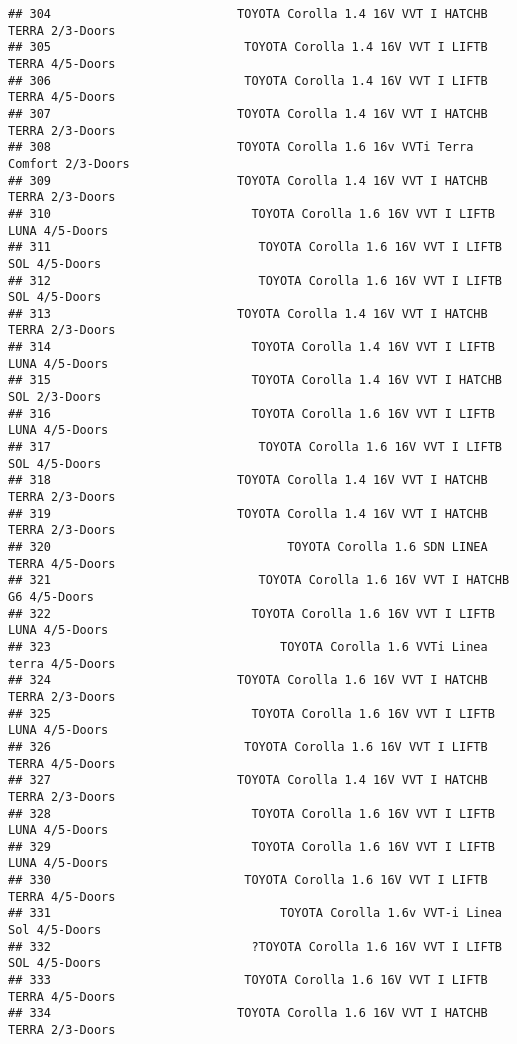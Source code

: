 \documentclass[]{article}
\begin{document}
\begin{verbatim}
## 304                          TOYOTA Corolla 1.4 16V VVT I HATCHB TERRA 2/3-Doors
## 305                           TOYOTA Corolla 1.4 16V VVT I LIFTB TERRA 4/5-Doors
## 306                           TOYOTA Corolla 1.4 16V VVT I LIFTB TERRA 4/5-Doors
## 307                          TOYOTA Corolla 1.4 16V VVT I HATCHB TERRA 2/3-Doors
## 308                          TOYOTA Corolla 1.6 16v VVTi Terra Comfort 2/3-Doors
## 309                          TOYOTA Corolla 1.4 16V VVT I HATCHB TERRA 2/3-Doors
## 310                            TOYOTA Corolla 1.6 16V VVT I LIFTB LUNA 4/5-Doors
## 311                             TOYOTA Corolla 1.6 16V VVT I LIFTB SOL 4/5-Doors
## 312                             TOYOTA Corolla 1.6 16V VVT I LIFTB SOL 4/5-Doors
## 313                          TOYOTA Corolla 1.4 16V VVT I HATCHB TERRA 2/3-Doors
## 314                            TOYOTA Corolla 1.4 16V VVT I LIFTB LUNA 4/5-Doors
## 315                            TOYOTA Corolla 1.4 16V VVT I HATCHB SOL 2/3-Doors
## 316                            TOYOTA Corolla 1.6 16V VVT I LIFTB LUNA 4/5-Doors
## 317                             TOYOTA Corolla 1.6 16V VVT I LIFTB SOL 4/5-Doors
## 318                          TOYOTA Corolla 1.4 16V VVT I HATCHB TERRA 2/3-Doors
## 319                          TOYOTA Corolla 1.4 16V VVT I HATCHB TERRA 2/3-Doors
## 320                                 TOYOTA Corolla 1.6 SDN LINEA TERRA 4/5-Doors
## 321                             TOYOTA Corolla 1.6 16V VVT I HATCHB G6 4/5-Doors
## 322                            TOYOTA Corolla 1.6 16V VVT I LIFTB LUNA 4/5-Doors
## 323                                TOYOTA Corolla 1.6 VVTi Linea terra 4/5-Doors
## 324                          TOYOTA Corolla 1.6 16V VVT I HATCHB TERRA 2/3-Doors
## 325                            TOYOTA Corolla 1.6 16V VVT I LIFTB LUNA 4/5-Doors
## 326                           TOYOTA Corolla 1.6 16V VVT I LIFTB TERRA 4/5-Doors
## 327                          TOYOTA Corolla 1.4 16V VVT I HATCHB TERRA 2/3-Doors
## 328                            TOYOTA Corolla 1.6 16V VVT I LIFTB LUNA 4/5-Doors
## 329                            TOYOTA Corolla 1.6 16V VVT I LIFTB LUNA 4/5-Doors
## 330                           TOYOTA Corolla 1.6 16V VVT I LIFTB TERRA 4/5-Doors
## 331                                TOYOTA Corolla 1.6v VVT-i Linea Sol 4/5-Doors
## 332                            ?TOYOTA Corolla 1.6 16V VVT I LIFTB SOL 4/5-Doors
## 333                           TOYOTA Corolla 1.6 16V VVT I LIFTB TERRA 4/5-Doors
## 334                          TOYOTA Corolla 1.6 16V VVT I HATCHB TERRA 2/3-Doors

\end{verbatim}
\end{document}
